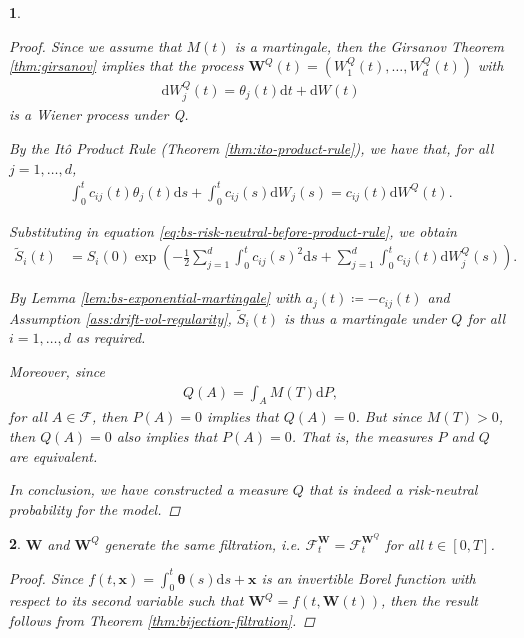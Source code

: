 \documentclass[english]{article}
\numberwithin{equation}{section}
\numberwithin{figure}{section}
\theoremstyle{bolddescit}
\newtheorem{theorem}{\protect\theoremname}[section]
\theoremstyle{definition}
\theoremstyle{definition}
\theoremstyle{plain}
\theoremstyle{plain}
\theoremstyle{bolddesc}
\theoremstyle{plain}
\theoremstyle{remark}
\providecommand{\theoremname}{Theorem}
\begin{document}
\begin{theorem}
\begin{proof}
    Since we assume that $M(t)$ is a martingale, then the Girsanov Theorem \ref{thm:girsanov} implies that the process $\mathbf{W}^Q(t) = (W^Q_1(t), \ldots, W^Q_d(t))$ with
    \begin{align*}
      \mathrm{d}W^Q_j(t) = \theta_j(t) \mathrm{d}t + \mathrm{d}W(t)
    \end{align*}
    is a Wiener process under Q.

    By the It\^o Product Rule (Theorem \ref{thm:ito-product-rule}), we have that, for all $j=1,\ldots,d$,
    \begin{align*}
      \int_0^t c_{ij}(t) \theta_j(t) \mathrm{d}s + \int_0^t c_{ij}(s) \mathrm{d}W_j(s)
      = c_{ij}(t) \mathrm{d}W^Q(t).
    \end{align*}

    Substituting in equation \eqref{eq:bs-risk-neutral-before-product-rule}, we obtain
    \begin{align}\label{eq:bs-discounted-stock-price}
      \widetilde{S}_i(t)
      &= S_i(0) \exp \left( - \frac{1}{2} \sum_{j=1}^{d} \int_0^t c_{ij}(s)^2 \mathrm{d}s
      + \sum_{j=1}^d \int_0^t c_{ij}(t) \mathrm{d}W^Q_j(s)\right).
    \end{align}

    By Lemma \ref{lem:bs-exponential-martingale} with $a_j(t) \coloneq - c_{ij}(t)$ and Assumption \ref{ass:drift-vol-regularity}, $\widetilde{S}_i(t)$ is thus a martingale under $Q$ for all $i=1,\ldots,d$ as required.

    Moreover, since
    \begin{align*}
      Q(A) = \int_A M(T) \mathrm{d}P,
    \end{align*}
    for all $A \in \mathcal{F}$, then $P(A) = 0$ implies that $Q(A) = 0$. But since $M(T) > 0$, then $Q(A) = 0$ also implies that $P(A) = 0$. That is, the measures $P$ and $Q$ are equivalent.

    In conclusion, we have constructed a measure $Q$ that is indeed a risk-neutral probability for the model.
  \end{proof}
\end{theorem}

\begin{theorem}
  $\mathbf{W}$ and $\mathbf{W}^Q$ generate the same filtration, i.e. $\mathcal{F}^\mathbf{W}_t = \mathcal{F}^{\mathbf{W}^Q}_t$ for all $t \in [0,T]$.

  \begin{proof}
    Since $f(t, \mathbf{x}) = \int_0^t \mathbf{\theta}(s) \mathrm{d}s + \mathbf{x}$ is an invertible Borel function with respect to its second variable such that $\mathbf{W}^Q = f(t,\mathbf{W}(t))$, then the result follows from Theorem \ref{thm:bijection-filtration}.
  \end{proof}
\end{theorem}
\end{document}
